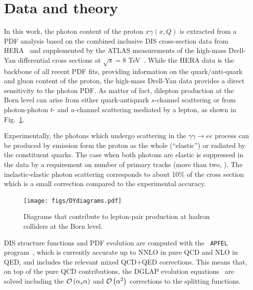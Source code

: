 \section{Data and theory}
\label{sec:theory}

In this work, the photon content of the proton $x\gamma(x,Q)$ is
extracted from a PDF analysis based on the combined inclusive DIS
cross-section data from HERA~\cite{Abramowicz:2015mha} and
supplemented by the ATLAS measurements of the high-mass Drell-Yan
differential cross sections at $\sqrt{s}=8$ TeV~\cite{Aad:2016zzw}.
%
While the HERA data is the backbone of all recent PDF fits, providing
information on the quark/anti-quark and gluon content of the proton,
the high-mass Drell-Yan data provides a direct sensitivity to the
photon PDF.
%
As matter of fact, dilepton production at the Born level can arise
from either quark-antiquark $s$-channel scattering or from
photon-photon $t$- and $u$-channel scattering mediated by a lepton, as
shown in Fig.~\ref{fig:photoninduced}.

Experimentally, the photons which undergo scattering in the
$\gamma\gamma \to ee$  process can be produced by emission form the
proton as the whole (``elastic'') or radiated by the constituent quarks.
The case when both photons are elastic is suppressed in the data by a
requirement on number of primary tracks (more than two, \cite{Aad:2016zzw}).  
The inelastic-elastic photon scattering corresponds to about 10\% of the
cross section which is a small correction compared to the experimental
accuracy.

\begin{figure}[t]
  \begin{center}
    \texttt{[image: figs/DYdiagrams.pdf]}
    \end{center}
    \caption{Diagrams that contribute to lepton-pair production at
      hadron colliders at the Born level.}
\label{fig:photoninduced}
\end{figure}

DIS structure functions and PDF evolution are computed with the {\tt
  APFEL} program~\cite{Bertone:2013vaa}, which is currently accurate
up to NNLO in pure QCD and NLO in QED, and includes the relevant mixed
QCD+QED corrections. This means that, on top of the pure QCD
contributions, the DGLAP evolution
equations~\cite{Gribov:1972ri,Dokshitzer:1977,Altarelli:1977zs} are
solved including the $\mathcal{O}\left( \alpha_s\alpha\right)$ and
$\mathcal{O}\left( \alpha^2\right)$ corrections to the splitting functions.

